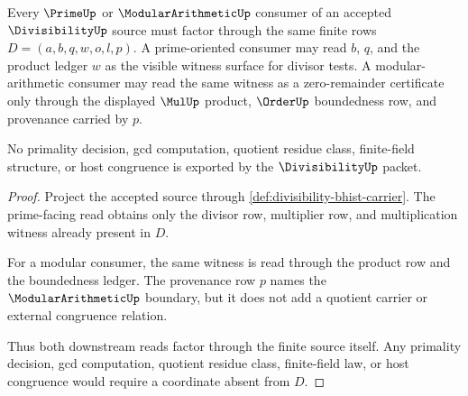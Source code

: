 \begin{theorem}
\label{thm:divisibility-prime-modular-boundary}
Every $\PrimeUp$ or $\ModularArithmeticUp$ consumer of an accepted
$\DivisibilityUp$ source must factor through the same finite rows
$D=(a,b,q,w,o,l,p)$. A prime-oriented consumer may read $b$, $q$, and the
product ledger $w$ as the visible witness surface for divisor tests. A
modular-arithmetic consumer may read the same witness as a zero-remainder
certificate only through the displayed $\MulUp$ product, $\OrderUp$
boundedness row, and provenance carried by $p$.

No primality decision, gcd computation, quotient residue class, finite-field
structure, or host congruence is exported by the $\DivisibilityUp$ packet.
\end{theorem}
\begin{proof}
Project the accepted source through
\autoref{def:divisibility-bhist-carrier}. The prime-facing read obtains only
the divisor row, multiplier row, and multiplication witness already present
in $D$.

For a modular consumer, the same witness is read through the product row and
the boundedness ledger. The provenance row $p$ names the
$\ModularArithmeticUp$ boundary, but it does not add a quotient carrier or
external congruence relation.

Thus both downstream reads factor through the finite source itself. Any
primality decision, gcd computation, quotient residue class, finite-field
law, or host congruence would require a coordinate absent from $D$.
\end{proof}

